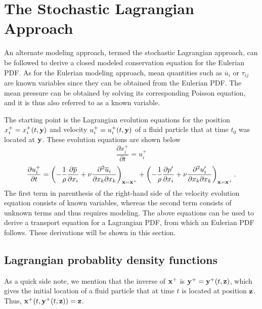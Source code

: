 \documentclass[oneside,a4paper,11pt]{report}
\newcommand{\pavg}{\overline{p}}
\newcommand{\uavg}{\overline{u}}
\newcommand{\pfluc}{p'}
\newcommand{\ufluc}{u'}
\newcommand{\rs}{\tau}          %
\begin{document}
\section{The Stochastic Lagrangian Approach}

An alternate modeling approach, termed the stochastic Lagrangian approach, can be followed to derive a closed modeled conservation equation for the Eulerian PDF. As for the Eulerian modeling approach, mean quantities such as $\uavg_i$ or $\rs_{ij}$ are known variables since they can be obtained from the Eulerian PDF. The mean pressure can be obtained by solving its corresponding Poisson equation, and it is thus also referred to as a known variable. 

The starting point is the Lagrangian evolution equations for the position $x_i^+ = x_i^+(t,\mathbf{y})$ and velocity $u_i^+ = u_i^+(t,\mathbf{y})$ of a fluid particle that at time $t_0$ was located at $\mathbf{y}$. These evolution equations are shown below 
\begin{equation}
\frac{\partial x_i^+}{\partial t} = u_i^+ 
\end{equation}
\begin{equation}
\frac{\partial u_i^+}{\partial t} = \left (-\frac{1}{\rho} \frac{\partial \pavg}{\partial x_i} + \nu \frac{\partial^2 \uavg_i}{\partial x_k \partial x_k} \right)_{\xvec = \xvec^+} + \left ( - \frac{1}{\rho} \frac{\partial \pfluc}{\partial x_i} +  \nu \frac{\partial^2 \ufluc_i}{\partial x_k \partial x_k} \right)_{\xvec = \xvec^+}.
\end{equation}
The first term in parenthesis of the right-hand side of the velocity evolution equation consists of known variables, whereas the second term consists of unknown terms and thus requires modeling. The above equations can be used to derive a transport equation for a Lagrangian PDF, from which an Eulerian PDF follows. These derivations will be shown in this section. 

\subsection{Lagrangian probablity density functions}

As a quick side note, we mention that the inverse of $\mathbf{x}^+$ is $\mathbf{y}^+ = \mathbf{y}^+(t,\mathbf{z})$, which gives the initial location of a fluid particle that at time $t$ is located at position $\mathbf{z}$. Thus, $\mathbf{x}^+(t,\mathbf{y}^+(t,\mathbf{z})) = \mathbf{z}$.
\end{document}
